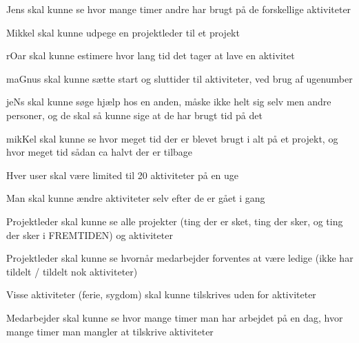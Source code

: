 



Jens skal kunne se hvor mange timer andre har brugt på de forskellige aktiviteter

Mikkel skal kunne udpege en projektleder til et projekt

rOar skal kunne estimere hvor lang tid det tager at lave en aktivitet

maGnus skal kunne sætte start og sluttider til aktiviteter, ved brug af ugenumber

jeNs skal kunne søge hjælp hos en anden, måske ikke helt sig selv men andre personer, og de skal så kunne sige at de har brugt tid på det

mikKel skal kunne se hvor meget tid der er blevet brugt i alt på et projekt, og hvor meget tid sådan ca halvt der er tilbage

Hver user skal være limited til 20 aktiviteter på en uge

Man skal kunne ændre aktiviteter selv efter de er gået i gang

Projektleder skal kunne se alle projekter (ting der er sket, ting der sker, og ting der sker i FREMTIDEN) og aktiviteter

Projektleder skal kunne se hvornår medarbejder forventes at være ledige (ikke har tildelt / tildelt nok aktiviteter)

Visse aktiviteter (ferie, sygdom) skal kunne tilskrives uden for aktiviteter

Medarbejder skal kunne se hvor mange timer man har arbejdet på en dag, hvor mange timer man mangler at tilskrive aktiviteter

